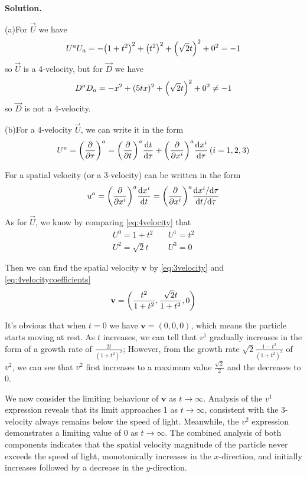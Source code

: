 \documentclass[12pt, a4paper, oneside]{article}
\newenvironment{solution}{\par\noindent\textbf{Solution. }}{\par}
\newcommand{\vc}[1]{\ensuremath{\overrightarrow{#1}}}
\renewcommand{\vb}[1]{\ensuremath{\mathbf{#1}}}
\begin{document}
\begin{solution}
    
    (a)For \vc{U} we have
    \[U^aU_a=-\qty(1+t^2)^2+\qty(t^2)^2+\qty(\sqrt{2}t)^2+0^2=-1\]
    so \vc{U} is a 4-velocity, but for \vc{D} we have
    \[D^aD_a=-x^2+(5tx)^2+\qty(\sqrt{2}t)^2+0^2\neq -1\]
    so \vc{D} is not a 4-velocity.

    (b)For a 4-velocity \vc{U}, we can write it in the form
    \begin{equation}
        U^a=\qty(\pv{\tau})^a=\qty(\pv{t})^a\dv{t}{\tau}+\qty(\pv{x^i})^a\dv{x^i}{\tau}\,(i=1,2,3)\label{eq:4velocity}
    \end{equation}

    For a spatial velocity (or a 3-velocity) can be written in the form
    \begin{equation}
        u^a=\qty(\pv{x^i})^a\dv{x^i}{t}=\qty(\pv{x^i})^a\frac{\mathrm{d}x^i/\mathrm{d}\tau}{\mathrm{d}t/\mathrm{d}\tau}\label{eq:3velocity}
    \end{equation}

    As for \vc{U}, we know by comparing \cref{eq:4velocity} that
    \begin{equation}\label{eq:4velocitycoefficients}
        \begin{split}
            U^0=1+t^2\quad&U^1=t^2\\
            U^2=\sqrt{2}t\quad&U^3=0
        \end{split}
    \end{equation}

    Then we can find the spatial velocity \vb{v} by \cref{eq:3velocity} and \cref{eq:4velocitycoefficients}
    \begin{equation}
        \vb{v}=\qty(\frac{t^2}{1+t^2}, \frac{\sqrt{2}t}{1+t^2}, 0)\label{eq:vspatial}
    \end{equation}

    It's obvious that when $t=0$ we have $\vb{v}=(0, 0, 0)$, which means the particle starts moving at rest. 
    As $t$ increases, we can tell that $v^1$ gradually increases in the form of a growth rate of $\frac{2t}{(1+t^2)^2}$; 
    However, from the growth rate $\sqrt{2}\frac{1-t^2}{(1+t^2)^2}$ of $v^2$, we can see that $v^2$ first increases to a maximum value $\frac{\sqrt{2}}{2}$ and the decreases to 0.

    We now consider the limiting behaviour of \vb{v} as $t\to\infty$. Analysis of the $v^1$ expression reveals that its limit approaches 1 as $t\to\infty$, consistent with the 3-velocity always remains below the speed of light.
    Meanwhile, the $v^2$ expression demonstrates a limiting value of 0 as $t\to\infty$.
    The combined analysis of both components indicates that the spatial velocity magnitude of the particle never exceeds the speed of light, monotonically increases in the $x$-direction, and initially increases followed by a decrease in the $y$-direction.


\end{solution}
\end{document}
